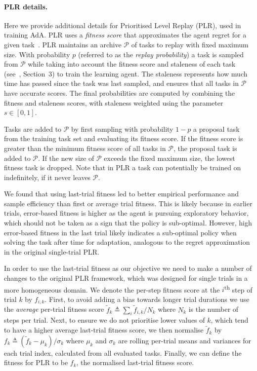 \paragraph{PLR details.} 
Here we provide additional details for Prioritised Level Replay (PLR), used in training AdA. PLR uses a \emph{fitness score} that approximates the agent regret for a given task~\citep{jiang2021robustplr, jiang2020prioritized}. PLR maintains an archive $\mathcal{P}$ of tasks to replay with fixed maximum size. With probability $p$ (referred to as the \emph{replay probability}) a task is sampled from $\mathcal{P}$ while taking into account the fitness score and staleness of each task (see~\citet{jiang2020prioritized}, Section~3) to train the learning agent. The staleness represents how much time has passed since the task was last sampled, and ensures that all tasks in $\mathcal{P}$ have accurate scores. The final probabilities are computed by combining the fitness and staleness scores, with staleness weighted using the parameter $s\in[0,1]$.

Tasks are added to $\mathcal{P}$ by first sampling with probability $1-p$ a proposal task from the training task set and evaluating its fitness score. If the fitness score is greater than the minimum fitness score of all tasks in $\mathcal{P}$, the proposal task is added to $\mathcal{P}$. If the new size of $\mathcal{P}$ exceeds the fixed maximum size, the lowest fitness task is dropped. Note that in PLR a task can potentially be trained on indefinitely, if it never leaves $\mathcal{P}$. 

We found that using last-trial fitness led to better empirical performance and sample efficiency than first or average trial fitness. This is likely because in earlier trials, error-based fitness is higher as the agent is pursuing exploratory behavior, which should not be taken as a sign that the policy is sub-optimal. However, high error-based fitness in the last trial likely indicates a sub-optimal policy when solving the task after time for adaptation, analogous to the regret approximation in the original single-trial PLR. 

In order to use the last-trial fitness as our objective we need to make a number of changes to the original PLR framework, which was designed for single trials in a more homogeneous domain. We denote the per-step fitness score at the $i$\textsuperscript{th} step of trial $k$ by $f_{i, k}$. First, to avoid adding a bias towards longer trial durations we use the \emph{average} per-trial fitness score $\tilde{f}_k \triangleq \sum_i \tilde{f}_{i, k} / N_k$ where $N_k$ is the number of steps per trial. Next, to ensure we do not prioritise lower values of $k$, which tend to have a higher average last-trial fitness score, we then normalise $\tilde{f}_k$ by $f_k \triangleq (\tilde{f}_k - \mu_k) / \sigma_k$ where $\mu_k$ and $\sigma_k$ are rolling per-trial means and variances for each trial index, calculated from all evaluated tasks. Finally, we can define the fitness for PLR to be $f_k$, the normalised last-trial fitness score.

